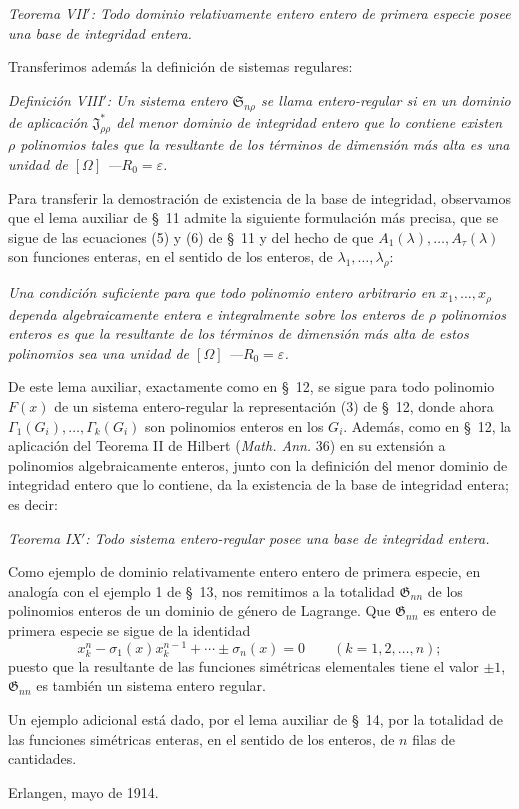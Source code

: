 \documentclass[11pt]{article}
\providecommand{\Ssys}{\mathfrak{S}}
\providecommand{\Jdom}{\mathfrak{J}}
\providecommand{\Gdom}{\mathfrak{G}}
\providecommand{\eps}{\varepsilon}
\begin{document}
\emph{Teorema VII$'$: Todo dominio relativamente entero entero de primera especie posee una base de integridad entera.}

Transferimos además la definición de sistemas regulares:

\emph{Definición VIII$'$: Un sistema entero $\Ssys_{n\rho}$ se llama entero-regular si en un dominio de aplicación $\Jdom^*_{\rho\rho}$ del menor dominio de integridad entero que lo contiene existen $\rho$ polinomios tales que la resultante de los términos de dimensión más alta es una unidad de $[\Omega]$ ---$R_0=\eps$.}

Para transferir la demostración de existencia de la base de integridad, observamos que el lema auxiliar de \S\ 11 admite la siguiente formulación más precisa, que se sigue de las ecuaciones (5) y (6) de \S\ 11 y del hecho de que $A_1(\lambda),\ldots,A_\tau(\lambda)$ son funciones enteras, en el sentido de los enteros, de $\lambda_1,\ldots,\lambda_\rho$:

\emph{Una condición suficiente para que todo polinomio entero arbitrario en $x_1,\ldots,x_\rho$ dependa algebraicamente entera e integralmente sobre los enteros de $\rho$ polinomios enteros es que la resultante de los términos de dimensión más alta de estos polinomios sea una unidad de $[\Omega]$ ---$R_0=\eps$.}

De este lema auxiliar, exactamente como en \S\ 12, se sigue para todo polinomio $F(x)$ de un sistema entero-regular la representación (3) de \S\ 12, donde ahora $\Gamma_1(G_i),\ldots,\Gamma_k(G_i)$ son polinomios enteros en los $G_i$. Además, como en \S\ 12, la aplicación del Teorema II de Hilbert (\emph{Math. Ann.} 36) en su extensión a polinomios algebraicamente enteros, junto con la definición del menor dominio de integridad entero que lo contiene, da la existencia de la base de integridad entera; es decir:

\emph{Teorema IX$'$: Todo sistema entero-regular posee una base de integridad entera.}

Como ejemplo de dominio relativamente entero entero de primera especie, en analogía con el ejemplo 1 de \S\ 13, nos remitimos a la totalidad $\Gdom_{nn}$ de los polinomios enteros de un dominio de género de Lagrange. Que $\Gdom_{nn}$ es entero de primera especie se sigue de la identidad
\[
  x_k^n-\sigma_1(x)x_k^{n-1}+\cdots\pm\sigma_n(x)=0
  \qquad(k=1,2,
\ldots,n);
\]
puesto que la resultante de las funciones simétricas elementales tiene el valor $\pm1$, $\Gdom_{nn}$ es también un sistema entero regular.

Un ejemplo adicional está dado, por el lema auxiliar de \S\ 14, por la totalidad de las funciones simétricas enteras, en el sentido de los enteros, de $n$ filas de cantidades.

Erlangen, mayo de 1914.
\end{document}
